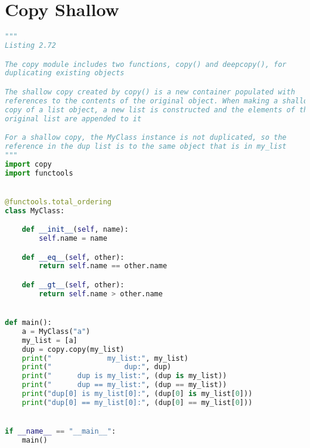 \documentclass[a4paper,landscape]{report}
\begin{document}
\section{Copy Shallow}
\begin{lstlisting}[language=Python]
"""
Listing 2.72

The copy module includes two functions, copy() and deepcopy(), for
duplicating existing objects

The shallow copy created by copy() is a new container populated with
references to the contents of the original object. When making a shallow
copy of a list object, a new list is constructed and the elements of the
original list are appended to it

For a shallow copy, the MyClass instance is not duplicated, so the
reference in the dup list is to the same object that is in my_list
"""
import copy
import functools


@functools.total_ordering
class MyClass:

    def __init__(self, name):
        self.name = name

    def __eq__(self, other):
        return self.name == other.name

    def __gt__(self, other):
        return self.name > other.name


def main():
    a = MyClass("a")
    my_list = [a]
    dup = copy.copy(my_list)
    print("             my_list:", my_list)
    print("                 dup:", dup)
    print("      dup is my_list:", (dup is my_list))
    print("      dup == my_list:", (dup == my_list))
    print("dup[0] is my_list[0]:", (dup[0] is my_list[0]))
    print("dup[0] == my_list[0]:", (dup[0] == my_list[0]))


if __name__ == "__main__":
    main()

\end{lstlisting}
\end{document}
